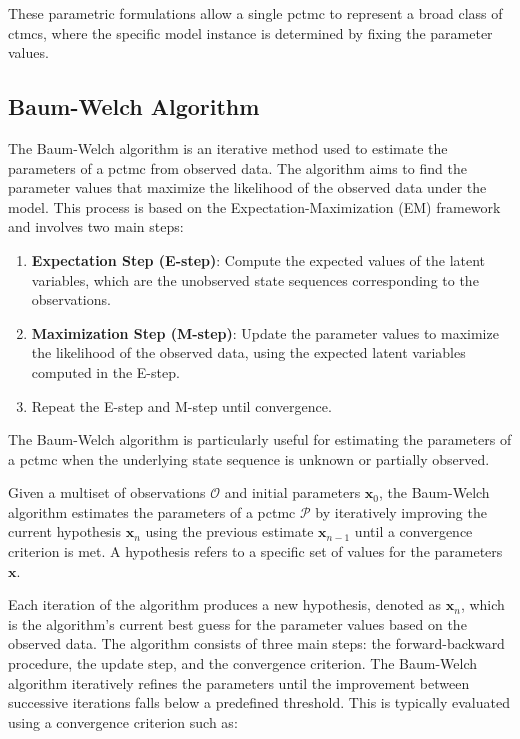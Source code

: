 These parametric formulations allow a single \gls{pctmc} to represent a broad class of \glspl{ctmc}, where the specific model instance is determined by fixing the parameter values.

\subsection{Baum-Welch Algorithm}\label{subsec:baum-welch}
The Baum-Welch algorithm is an iterative method used to estimate the parameters of a \gls{pctmc} from observed data.
The algorithm aims to find the parameter values that maximize the likelihood of the observed data under the model.
This process is based on the Expectation-Maximization (EM) framework and involves two main steps:

\begin{enumerate}
    \item \textbf{Expectation Step (E-step)}: Compute the expected values of the latent variables, which are the unobserved state sequences corresponding to the observations.
    \item \textbf{Maximization Step (M-step)}: Update the parameter values to maximize the likelihood of the observed data, using the expected latent variables computed in the E-step.
    \item Repeat the E-step and M-step until convergence.
\end{enumerate}

The Baum-Welch algorithm is particularly useful for estimating the parameters of a \gls{pctmc} when the underlying state sequence is unknown or partially observed.

Given a multiset of observations $\mathcal{O}$ and initial parameters $\textbf{x}_0$, the Baum-Welch algorithm estimates the parameters of a \gls{pctmc} $\mathcal{P}$ by iteratively improving the current hypothesis $\textbf{x}_n$ using the previous estimate $\textbf{x}_{n-1}$ until a convergence criterion is met.
A hypothesis refers to a specific set of values for the parameters $\mathbf{x}$.

Each iteration of the algorithm produces a new hypothesis, denoted as $\textbf{x}_n$, which is the algorithm's current best guess for the parameter values based on the observed data.
The algorithm consists of three main steps: the forward-backward procedure, the update step, and the convergence criterion.
The Baum-Welch algorithm iteratively refines the parameters until the improvement between successive iterations falls below a predefined threshold.
This is typically evaluated using a convergence criterion such as:

